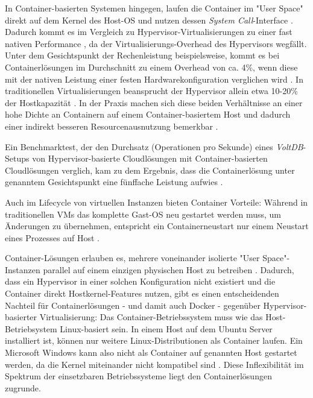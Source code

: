 \documentclass[../main.tex]{subfiles}
\begin{document}
      In Container-basierten Systemen hingegen, laufen die Container im "User Space" direkt auf dem Kernel des Host-OS und nutzen dessen \emph{System Call}-Interface \cite[S.6+7]{dockerBook}. Dadurch kommt es im Vergleich zu Hypervisor-Virtualisierungen zu einer fast nativen Performance \cite[S.1]{containerVirtPerformance}, da der Virtualisierungs-Overhead des Hypervisors wegfällt. Unter dem Gesichtspunkt der Rechenleistung beispielsweise, kommt es bei Containerlösungen im Durchschnitt zu einem Overhead von ca. 4\%, wenn diese mit der nativen Leistung einer festen Hardwarekonfiguration verglichen wird \cite[S.4]{containerVirtPerformance}\cite[S.5]{IBMcontVMcomparison}. In traditionellen Virtualisierungen beansprucht der Hypervisor allein etwa 10-20\% der Hostkapazität \cite[S.2]{dockerIntroIEEE}\cite[S.5]{IBMcontVMcomparison}. In der Praxis machen sich diese beiden Verhältnisse an einer hohe Dichte an Containern auf einem Container-basiertem Host und dadurch einer indirekt besseren Resourcenausnutzung bemerkbar \cite[S.7+8]{dockerBook}.

      Ein Benchmarktest, der den Durchsatz (Operationen pro Sekunde) eines \emph{VoltDB}-Setups\cite{voltdb} von Hypervisor-basierte Cloudlösungen mit Container-basierten Cloudlösungen verglich, kam zu dem Ergebnis, dass die Containerlösung unter genanntem Gesichtspunkt eine fünffache Leistung aufwies \cite[S.2+3]{voltdbBenchmark}.

      Auch im Lifecycle von virtuellen Instanzen bieten Container Vorteile: Während in traditionellen VMs das komplette Gast-OS neu gestartet werden muss, um Änderungen zu übernehmen, entspricht ein Containerneustart nur einem Neustart eines Prozesses auf Host \cite[S.2]{dockerLXCKub}.

      Container-Lösungen erlauben es, mehrere voneinander isolierte "User Space"-Instanzen parallel auf einem einzigen physischen Host zu betreiben \cite[S.6]{dockerBook}. Dadurch, dass ein Hypervisor in einer solchen Konfiguration nicht existiert und die Container direkt Hostkernel-Features nutzen, gibt es einen entscheidenden Nachteil für Containerlösungen - und damit auch Docker - gegenüber Hypervisor-basierter Virtualisierung: Das Container-Betriebssystem muss wie das Host-Betriebsystem Linux-basiert sein. In einem Host auf dem Ubuntu Server installiert ist, können nur weitere Linux-Distributionen als Container laufen. Ein Microsoft Windows kann also nicht als Container auf genannten Host gestartet werden, da die Kernel miteinander nicht kompatibel sind \cite[S.6]{dockerBook}. Diese Inflexibilität im Spektrum der einsetzbaren Betriebssysteme liegt den Containerlösungen zugrunde.
\end{document}
